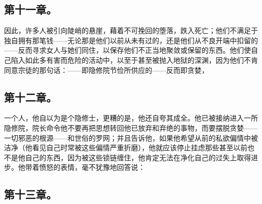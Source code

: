 
\subsection{第十一章。}

\par

因此，许多人被引向陡峭的悬崖，藉着不可挽回的堕落，跌入死亡；他们不满足于独自拥有那笔钱——无论那是他们以前从未有过的，还是他们从不良开端中扣留的——反而寻求女人与她们同住，以保存他们不正当地聚敛或保留的东西。他们使自己陷入如此多有害而危险的活动中，以至于甚至被抛入地狱的深渊，因为他们不肯同意宗徒的那句话：——即隐修院节俭所供应的——反而即贪婪，\par


\subsection{第十二章。}

\par

一个人，他自以为是个隐修士，更糟的是，他还自夸其成全。他已被接纳进入一所隐修院，院长命令他不要再把思想转回他已放弃和弃绝的事物，而要摆脱贪婪——一切邪恶的根源——和世俗的罗网；并且告诉他，如果他希望从前的私欲偏情中被洁净（他看见自己时常被这些偏情严重折磨），他就应该停止挂虑那些甚至以前也不是他自己的东西，因为被这些锁链缠住，他肯定无法在净化自己的过失上取得进步。他带着愤怒的表情，毫不犹豫地回答说：\par


\subsection{第十三章。}

\par

